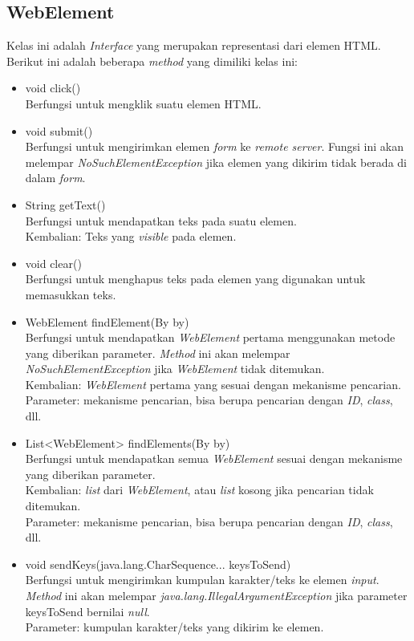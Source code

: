 \subsection{WebElement}
\label{subsec:webelement}  
Kelas ini adalah \textit{Interface} yang  merupakan representasi dari elemen HTML\cite{Selenium_java_doc}. Berikut ini adalah beberapa \textit{method} yang dimiliki kelas ini:
\begin{itemize}
\item void click()\\
Berfungsi untuk mengklik suatu elemen HTML.
\item void submit()\\
Berfungsi untuk mengirimkan elemen \textit{form} ke \textit{remote server}. Fungsi ini akan melempar \textit{NoSuchElementException} jika elemen yang dikirim tidak berada di dalam \textit{form}. 
\item String getText()\\
Berfungsi untuk mendapatkan teks pada suatu elemen.\\
Kembalian: Teks yang \textit{visible} pada elemen.

\item void clear()\\
Berfungsi untuk menghapus teks pada elemen yang digunakan untuk memasukkan teks.
\item WebElement findElement(By by)\\
Berfungsi untuk mendapatkan \textit{WebElement} pertama menggunakan metode yang diberikan parameter. \textit{Method} ini akan melempar \textit{NoSuchElementException} jika \textit{WebElement} tidak ditemukan.\\
Kembalian: \textit{WebElement} pertama yang sesuai dengan mekanisme pencarian.\\
Parameter: mekanisme pencarian, bisa berupa pencarian dengan \textit{ID}, \textit{class}, dll.

\item List<WebElement> findElements(By by)\\
Berfungsi untuk mendapatkan semua \textit{WebElement} sesuai dengan mekanisme yang diberikan parameter.\\
Kembalian: \textit{list} dari \textit{WebElement}, atau \textit{list} kosong jika pencarian tidak ditemukan.\\
Parameter: mekanisme pencarian, bisa berupa pencarian dengan \textit{ID}, \textit{class}, dll.
\item void sendKeys(java.lang.CharSequence... keysToSend)\\
Berfungsi untuk mengirimkan kumpulan karakter/teks ke elemen \textit{input}. \textit{Method} ini akan melempar \textit{java.lang.IllegalArgumentException} jika parameter keysToSend bernilai \textit{null}.\\
Parameter: kumpulan karakter/teks yang dikirim ke elemen.
\end{itemize} 

